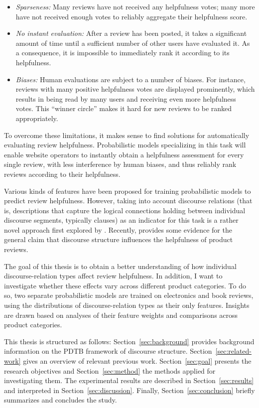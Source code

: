 \documentclass[
    a4paper,%
    12pt,%
    oneside,%
    toc=bibliography,
    final,
]{scrartcl}
\begin{document}
\begin{itemize}
\item \textit{Sparseness:} Many reviews have not received any helpfulness votes; many more have not received enough votes to reliably aggregate their helpfulness score.
\item \textit{No instant evaluation:} After a review has been posted, it takes a significant amount of time until a sufficient number of other users have evaluated it. As a consequence, it is impossible to immediately rank it according to its helpfulness.
\item \textit{Biases:} Human evaluations are subject to a number of biases. For instance, reviews with many positive helpfulness votes are displayed prominently, which results in being read by many users and receiving even more helpfulness votes. This “winner circle” makes it hard for new reviews to be ranked appropriately.
\end{itemize}

To overcome these limitations, it makes sense to find solutions for automatically evaluating review helpfulness. Probabilistic models specializing in this task will enable website operators to instantly obtain a helpfulness assessment for every single review, with less interference by human biases, and thus reliably rank reviews according to their helpfulness.


Various kinds of features have been proposed for training probabilistic models to predict review helpfulness. However, taking into account discourse relations (that is, descriptions that capture the logical connections holding between individual discourse segments, typically clauses) as an indicator for this task is a rather novel approach first explored by \citet{Mertz2014}. Recently, \citet{Golly2017} provides some evidence for the general claim that discourse structure influences the helpfulness of product reviews.

The goal of this thesis is to obtain a better understanding of how individual discourse-relation types affect review helpfulness. In addition, I want to investigate whether these effects vary across different product categories. To do so, two separate probabilistic models are trained on electronics and book reviews, using the distributions of discourse-relation types as their only features. Insights are drawn based on analyses of their feature weights and comparisons across product categories.

This thesis is structured as follows: Section~\ref{sec:background} provides background information on the PDTB framework of discourse structure. Section~\ref{sec:related-work} gives an overview of relevant previous work. Section~\ref{sec:goal} presents the research objectives and Section~\ref{sec:method} the methods applied for investigating them. The experimental results are described in Section~\ref{sec:results} and interpreted in Section~\ref{sec:discussion}. Finally, Section~\ref{sec:conclusion} briefly summarizes and concludes the study.
\end{document}
